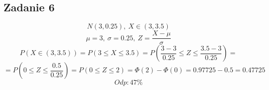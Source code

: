 \subsection{Zadanie 6}
$$N(3,0.25), \ X\in(3,3.5)$$
$$\mu=3, \ \sigma=0.25, \ Z=\frac{X-\mu}{\sigma}$$
$$P(X\in(3,3.5))=P(3\le X \le 3.5)=
P(\frac{3-3}{0.25}\le Z \le \frac{3.5-3}{0.25})=$$
$$=P(0\le Z \le \frac{0.5}{0.25})=
P(0\le Z \le 2)=
\Phi(2) - \Phi(0)=
0.97725 - 0.5=
0.47725$$
$$ Odp: 47\% $$